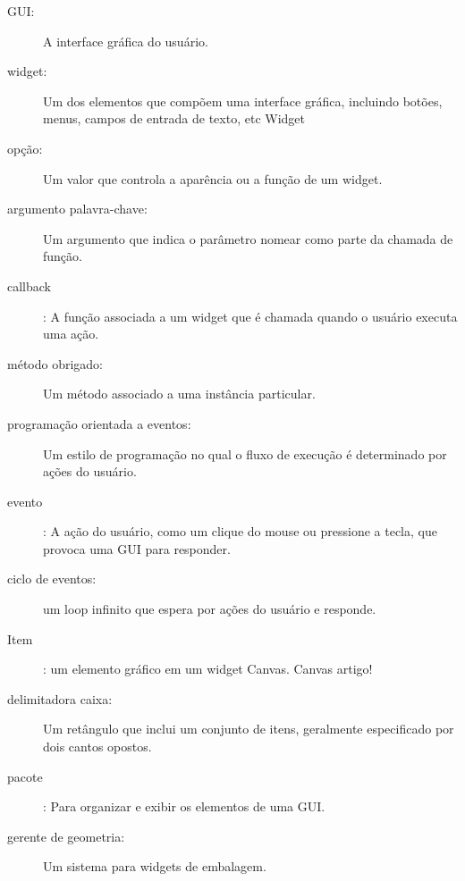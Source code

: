 \documentclass[10pt]{book}
\begin{document}
\begin{v erbatim}
\begin{description}

\item[GUI:] A interface gráfica do usuário.

\item[widget:] Um dos elementos que compõem uma interface gráfica, incluindo
botões, menus, campos de entrada de texto, etc 
\index{} Widget

\item[opção:] Um valor que controla a aparência ou a função de
um widget.

\item[argumento palavra-chave:] Um argumento que indica o parâmetro
nomear como parte da chamada de função.

\item[callback]: A função associada a um widget que é
chamada quando o usuário executa uma ação.

\item[método obrigado:] Um método associado a uma instância particular.

\item[programação orientada a eventos:] Um estilo de programação no qual
o fluxo de execução é determinado por ações do usuário.

\item[evento]: A ação do usuário, como um clique do mouse ou pressione a tecla, que
provoca uma GUI para responder.

\item[ciclo de eventos:] um loop infinito que espera por ações do usuário
e responde.

\item[Item]: um elemento gráfico em um widget Canvas.
{Canvas artigo!} \Index

\item[delimitadora caixa:] Um retângulo que inclui um conjunto de itens,
geralmente especificado por dois cantos opostos.

\item[pacote]: Para organizar e exibir os elementos de uma GUI.

\item[gerente de geometria:] Um sistema para widgets de embalagem.


\end{description}
\end{v erbatim}
\end{document}
